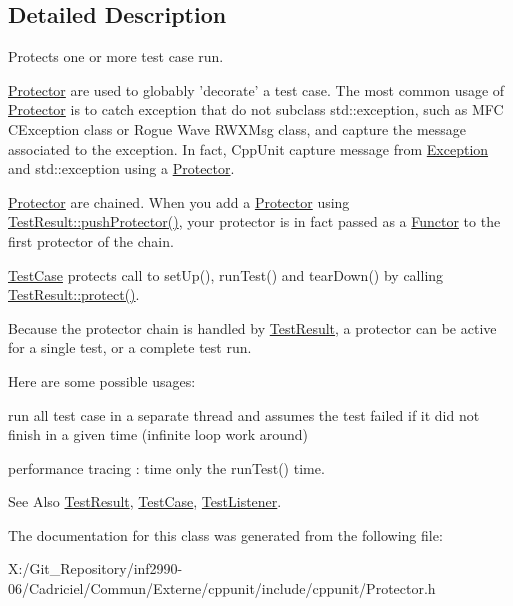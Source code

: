 \subsection{Detailed Description}
Protects one or more test case run. 

\hyperlink{class_protector}{Protector} are used to globably 'decorate' a test case. The most common usage of \hyperlink{class_protector}{Protector} is to catch exception that do not subclass std\-::exception, such as M\-F\-C C\-Exception class or Rogue Wave R\-W\-X\-Msg class, and capture the message associated to the exception. In fact, Cpp\-Unit capture message from \hyperlink{class_exception}{Exception} and std\-::exception using a \hyperlink{class_protector}{Protector}.

\hyperlink{class_protector}{Protector} are chained. When you add a \hyperlink{class_protector}{Protector} using \hyperlink{class_test_result_a1a4fbbca38cb73e8e00905193b7593dc}{Test\-Result\-::push\-Protector()}, your protector is in fact passed as a \hyperlink{class_functor}{Functor} to the first protector of the chain.

\hyperlink{class_test_case}{Test\-Case} protects call to set\-Up(), run\-Test() and tear\-Down() by calling \hyperlink{class_test_result_a243b3097a3d9468abc61e7910bbaa8b7}{Test\-Result\-::protect()}.

Because the protector chain is handled by \hyperlink{class_test_result}{Test\-Result}, a protector can be active for a single test, or a complete test run.

Here are some possible usages\-:
\begin{DoxyItemize}
\item run all test case in a separate thread and assumes the test failed if it did not finish in a given time (infinite loop work around)
\item performance tracing \-: time only the run\-Test() time. \begin{DoxySeeAlso}{See Also}
\hyperlink{class_test_result}{Test\-Result}, \hyperlink{class_test_case}{Test\-Case}, \hyperlink{class_test_listener}{Test\-Listener}. 
\end{DoxySeeAlso}

\end{DoxyItemize}

The documentation for this class was generated from the following file\-:\begin{DoxyCompactItemize}
\item 
X\-:/\-Git\-\_\-\-Repository/inf2990-\/06/\-Cadriciel/\-Commun/\-Externe/cppunit/include/cppunit/Protector.\-h\end{DoxyCompactItemize}
